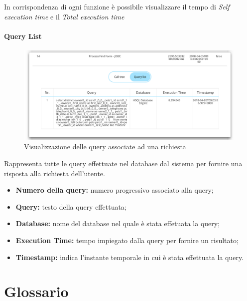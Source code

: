 In corrispondenza di ogni funzione è possibile visualizzare il tempo di \emph{Self execution time} e il \emph{Total execution time}
\\

\paragraph {Query List} \Spazio
\begin{figure}[H]
	\centering 
	\includegraphics[width=1\textwidth]{Images/querylist}
	\caption{Visualizzazione delle query associate ad una richiesta}
\end{figure}
Rappresenta tutte le query effettuate nel database dal sistema per fornire una risposta alla richiesta dell'utente.
    \begin{itemize}
	
	\item \textbf{Numero della query:} numero progressivo associato alla query;
	\item \textbf{Query:} testo della query effettuata;
	\item \textbf{Database:} nome del database nel quale è stata effetuata la query;
	\item \textbf{Execution Time:} tempo impiegato dalla query per fornire un risultato;
	\item \textbf{Timestamp:} indica l'instante temporale in cui è stata effettuata la query.
	
\end{itemize}



\newpage
\appendix
\section{Glossario}


